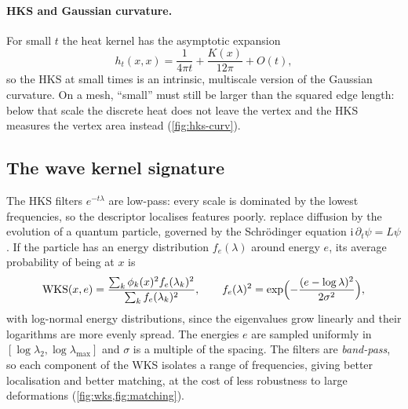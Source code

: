 
\paragraph{HKS and Gaussian curvature.} For small $t$ the heat kernel has the asymptotic expansion
\begin{equation}
h_t(x,x)=\frac{1}{4\pi t}+\frac{K(x)}{12\pi}+O(t),
\end{equation}
so the HKS at small times is an intrinsic, multiscale version of the Gaussian curvature. On a mesh,
``small'' must still be larger than the squared edge length: below that scale the discrete heat
does not leave the vertex and the HKS measures the vertex area instead (\cref{fig:hks-curv}).


\subsection{The wave kernel signature}

The HKS filters $e^{-t\lambda}$ are low-pass: every scale is dominated by the lowest frequencies, so the
descriptor localises features poorly. \citet{Aubry2011} replace diffusion by the evolution of a quantum
particle, governed by the Schr\"odinger equation $\mathrm i\,\partial_t\psi=L\psi$. If the particle has
an energy distribution $f_e(\lambda)$ around energy $e$, its average probability of being at $x$ is
\begin{equation}
\mathrm{WKS}(x,e)=\frac{\sum_k\phi_k(x)^2f_e(\lambda_k)^2}{\sum_kf_e(\lambda_k)^2},\qquad
f_e(\lambda)^2=\exp\Bigl(-\frac{(e-\log\lambda)^2}{2\sigma^2}\Bigr),
\end{equation}
with log-normal energy distributions, since the eigenvalues grow linearly and their logarithms are
more evenly spread. The energies $e$ are sampled uniformly in $[\log\lambda_2,\log\lambda_{\max}]$ and
$\sigma$ is a multiple of the spacing. The filters are \emph{band-pass}, so each component of the WKS
isolates a range of frequencies, giving better localisation and better matching, at the cost of
less robustness to large deformations (\cref{fig:wks,fig:matching}).

